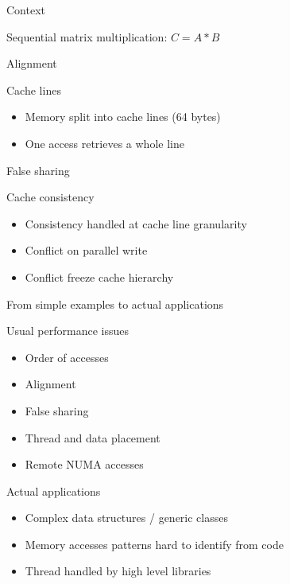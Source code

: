 \documentclass[xcolor={usenames,dvipsnames},hyperref={pdfusetitle}]{beamer}
\begin{document}
\begin{section}{Context}
\begin{frame}{Sequential matrix multiplication: $C=A*B$}
    \centering
    \scalebox{.6}{
        
    }
\end{frame}

\begin{frame}{Alignment}
    \hspace{-40pt}
    \scalebox{.8}{
        
    }
    \begin{block}{Cache lines}
        \begin{itemize}
            \item Memory split into cache lines (64 bytes)
            \item<alert@1-> One access retrieves a whole line
        \end{itemize}
    \end{block}
\end{frame}

\begin{frame}{False sharing}
    \hspace{-35pt}
    \scalebox{.8}{
        
    }
    \vspace{20pt}
    \begin{block}{Cache consistency}
        \begin{itemize}
            \item Consistency handled at cache line granularity
            \item<alert@1-> Conflict on parallel write
            \item Conflict freeze cache hierarchy
        \end{itemize}
    \end{block}
\end{frame}

\begin{frame}{From simple examples to actual applications}
    \begin{block}{Usual performance issues}
        \begin{itemize}
            \item Order of accesses
            \item Alignment
            \item False sharing
            \item Thread and data placement
            \item Remote NUMA accesses
        \end{itemize}
    \end{block}
    \pause
    \begin{alertblock}{Actual applications}
        \begin{itemize}
            \item Complex data structures / generic classes
            \item Memory accesses patterns hard to identify from code
            \item Thread handled by high level libraries
        \end{itemize}
    \end{alertblock}
\end{frame}


\end{section}
\end{document}
